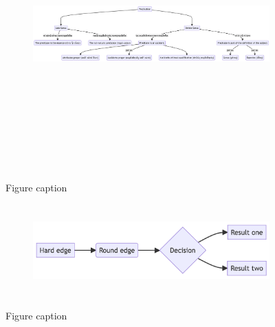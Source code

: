 \documentclass[
  12pt,
  a4paper,
  oneside,
  titlepage,
  toclink=all,
  toc=bibliography]{scrbook}
\theoremstyle{definition}
\theoremstyle{plain}
\theoremstyle{plain}
\theoremstyle{plain}
\theoremstyle{plain}
\theoremstyle{definition}
\theoremstyle{definition}
\theoremstyle{plain}
\theoremstyle{remark}
\begin{document}
\hypertarget{fig-scriv18}{}
\begin{figure}

\begin{figure}[H]

{\centering \includegraphics[width=17.26in,height=4.08in]{index_files/figure-latex/mermaid-figure-1.png}

}

\end{figure}

\label{fig-scriv18}Figure caption

\end{figure}

\begin{figure}

{\centering 

\begin{figure}[H]

{\centering \includegraphics[width=5.73in,height=1.39in]{index_files/figure-latex/mermaid-figure-4.png}

}

\end{figure}

}

\caption{\label{fig-scriv18B}Figure caption}

\end{figure}
\end{document}
